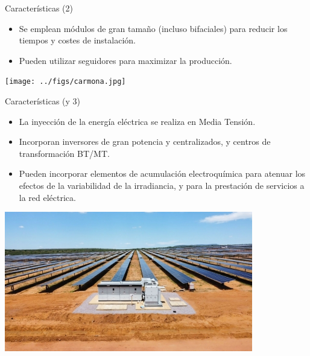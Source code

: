 \documentclass[aspectratio=169, usenames,svgnames,dvipsnames]{beamer}
\begin{document}
\begin{frame}[label={sec:org2f9ec8b}]{Características (2)}
\begin{itemize}
\item Se emplean \alert{módulos de gran tamaño} (incluso bifaciales) para reducir los tiempos y costes de instalación.
\item Pueden utilizar \alert{seguidores} para maximizar la producción.
\end{itemize}

\begin{center}
\texttt{[image: ../figs/carmona.jpg]}
\end{center}
\end{frame}

\begin{frame}[label={sec:org2f73147}]{Características (y 3)}
\begin{itemize}
\item La inyección de la energía eléctrica se realiza en \alert{Media Tensión}.
\item Incorporan \alert{inversores de gran potencia} y centralizados, y centros de transformación BT/MT.
\item Pueden incorporar \alert{elementos de acumulación electroquímica} para atenuar los efectos de la variabilidad de la irradiancia, y para la prestación de servicios a la red eléctrica.
\end{itemize}

\begin{center}
\includegraphics[height=0.5\textheight]{../figs/1power_station_de_ingeteam_en_la_planta_pv_bon_nome.jpg}
\end{center}
\end{frame}
\end{document}

